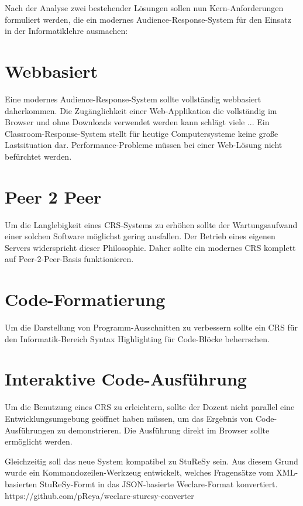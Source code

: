 Nach der Analyse zwei bestehender Lösungen sollen nun Kern-Anforderungen formuliert werden, die ein modernes Audience-Response-System für den Einsatz in der Informatiklehre ausmachen:

\section{Webbasiert}
\label{chap:webbasiert}
Eine modernes Audience-Response-System sollte vollständig webbasiert daherkommen. Die Zugänglichkeit einer Web-Applikation die vollständig im Browser und ohne Downloads verwendet werden kann schlägt viele ...
Ein Classroom-Response-System stellt für heutige Computersysteme keine große Lastsituation dar. Performance-Probleme müssen bei einer Web-Lösung nicht befürchtet werden.
\section{Peer 2 Peer}
\label{chap:p2p}
Um die Langlebigkeit eines CRS-Systems zu erhöhen sollte der Wartungsaufwand einer solchen Software möglichst gering ausfallen. Der Betrieb eines eigenen Servers widerspricht dieser Philosophie. Daher sollte ein modernes CRS komplett auf Peer-2-Peer-Basis funktionieren.

\section{Code-Formatierung}
\label{chap:codeformatierung}
Um die Darstellung von Programm-Ausschnitten zu verbessern sollte ein CRS für den Informatik-Bereich Syntax Highlighting für Code-Blöcke beherrschen.

\section{Interaktive Code-Ausführung}
\label{chap:codeausfuehrung}
Um die Benutzung eines CRS zu erleichtern, sollte der Dozent nicht parallel eine Entwicklungsumgebung geöffnet haben müssen, um das Ergebnis von Code-Ausführungen zu demonstrieren. Die Ausführung direkt im Browser sollte ermöglicht werden.

Gleichzeitig soll das neue System kompatibel zu StuReSy sein. Aus diesem Grund wurde ein Kommandozeilen-Werkzeug entwickelt, welches Fragensätze vom XML-basierten StuReSy-Formt in das JSON-basierte Weclare-Format konvertiert. https://github.com/pReya/weclare-sturesy-converter
